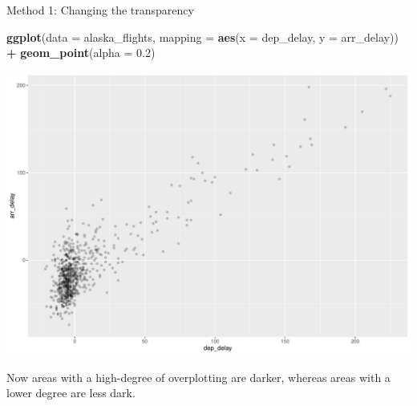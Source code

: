 \documentclass[
  ignorenonframetext,
]{beamer}
\newenvironment{Shaded}{\begin{snugshade}}{\end{snugshade}}
\newcommand{\AttributeTok}[1]{\textcolor[rgb]{0.13,0.29,0.53}{#1}}
\newcommand{\FloatTok}[1]{\textcolor[rgb]{0.00,0.00,0.81}{#1}}
\newcommand{\FunctionTok}[1]{\textcolor[rgb]{0.13,0.29,0.53}{\textbf{#1}}}
\newcommand{\NormalTok}[1]{#1}
\newcommand{\SpecialCharTok}[1]{\textcolor[rgb]{0.81,0.36,0.00}{\textbf{#1}}}
\begin{document}
\begin{frame}[fragile]{Method 1: Changing the transparency}
\protect\hypertarget{method-1-changing-the-transparency-1}{}
\tiny

\begin{Shaded}
\begin{Highlighting}[]
\FunctionTok{ggplot}\NormalTok{(}\AttributeTok{data =}\NormalTok{ alaska\_flights, }\AttributeTok{mapping =} \FunctionTok{aes}\NormalTok{(}\AttributeTok{x =}\NormalTok{ dep\_delay, }\AttributeTok{y =}\NormalTok{ arr\_delay)) }\SpecialCharTok{+} 
  \FunctionTok{geom\_point}\NormalTok{(}\AttributeTok{alpha =} \FloatTok{0.2}\NormalTok{)}
\end{Highlighting}
\end{Shaded}

\begin{center}\includegraphics[width=0.7\linewidth,height=0.5\textheight]{Week2_Lect_files/figure-beamer/unnamed-chunk-22-1} \end{center}
\normalsize

Now areas with a high-degree of overplotting are darker, whereas areas
with a lower degree are less dark.
\end{frame}
\end{document}
